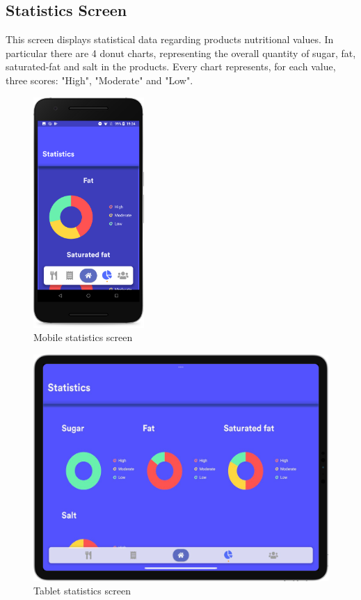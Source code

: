 \subsection{Statistics Screen}
This screen displays statistical data regarding products nutritional values.
In particular there are 4 donut charts, representing the overall quantity of sugar, fat, saturated-fat and salt in the products.
Every chart represents, for each value, three scores: "High", "Moderate" and "Low".

\begin{figure}[H]
  \centering
    \vspace*{-0.3cm}
     \includegraphics[width=42mm,scale=0.9]{./Images//Mobile_mocks/statistics1.png}
     \vspace*{-0.3cm}
     \caption{Mobile statistics screen}
\end{figure}

\vspace*{-0.3cm}
\begin{figure}[H]
  \centering
    \includegraphics[scale=0.22]{./Images//Tablet_mocks/statistics1.png}
    \vspace*{-0.3cm}
    \caption{Tablet statistics screen}
\end{figure}